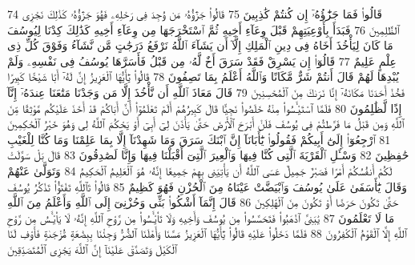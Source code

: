 {\tiny\colorbox{cl_aya}{74}} قَالُوا۟ فَمَا جَزَٰٓؤُهُۥٓ إِن كُنتُمْ كَٰذِبِينَ
{\tiny\colorbox{cl_aya}{75}} قَالُوا۟ جَزَٰٓؤُهُۥ مَن وُجِدَ فِى رَحْلِهِۦ فَهُوَ جَزَٰٓؤُهُۥ كَذَٰلِكَ نَجْزِى ٱلظَّٰلِمِينَ
{\tiny\colorbox{cl_aya}{76}} فَبَدَأَ بِأَوْعِيَتِهِمْ قَبْلَ وِعَآءِ أَخِيهِ ثُمَّ ٱسْتَخْرَجَهَا مِن وِعَآءِ أَخِيهِ كَذَٰلِكَ كِدْنَا لِيُوسُفَ مَا كَانَ لِيَأْخُذَ أَخَاهُ فِى دِينِ ٱلْمَلِكِ إِلَّآ أَن يَشَآءَ ٱللَّهُ نَرْفَعُ دَرَجَٰتٍ مَّن نَّشَآءُ وَفَوْقَ كُلِّ ذِى عِلْمٍ عَلِيمٌ
{\tiny\colorbox{cl_aya}{77}} قَالُوٓا۟ إِن يَسْرِقْ فَقَدْ سَرَقَ أَخٌ لَّهُۥ مِن قَبْلُ فَأَسَرَّهَا يُوسُفُ فِى نَفْسِهِۦ وَلَمْ يُبْدِهَا لَهُمْ قَالَ أَنتُمْ شَرٌّ مَّكَانًا وَٱللَّهُ أَعْلَمُ بِمَا تَصِفُونَ
{\tiny\colorbox{cl_aya}{78}} قَالُوا۟ يَٰٓأَيُّهَا ٱلْعَزِيزُ إِنَّ لَهُۥٓ أَبًا شَيْخًا كَبِيرًا فَخُذْ أَحَدَنَا مَكَانَهُۥٓ إِنَّا نَرَىٰكَ مِنَ ٱلْمُحْسِنِينَ
{\tiny\colorbox{cl_aya}{79}} قَالَ مَعَاذَ ٱللَّهِ أَن نَّأْخُذَ إِلَّا مَن وَجَدْنَا مَتَٰعَنَا عِندَهُۥٓ إِنَّآ إِذًا لَّظَٰلِمُونَ
{\tiny\colorbox{cl_aya}{80}} فَلَمَّا ٱسْتَيْـَٔسُوا۟ مِنْهُ خَلَصُوا۟ نَجِيًّا قَالَ كَبِيرُهُمْ أَلَمْ تَعْلَمُوٓا۟ أَنَّ أَبَاكُمْ قَدْ أَخَذَ عَلَيْكُم مَّوْثِقًا مِّنَ ٱللَّهِ وَمِن قَبْلُ مَا فَرَّطتُمْ فِى يُوسُفَ فَلَنْ أَبْرَحَ ٱلْأَرْضَ حَتَّىٰ يَأْذَنَ لِىٓ أَبِىٓ أَوْ يَحْكُمَ ٱللَّهُ لِى وَهُوَ خَيْرُ ٱلْحَٰكِمِينَ
{\tiny\colorbox{cl_aya}{81}} ٱرْجِعُوٓا۟ إِلَىٰٓ أَبِيكُمْ فَقُولُوا۟ يَٰٓأَبَانَآ إِنَّ ٱبْنَكَ سَرَقَ وَمَا شَهِدْنَآ إِلَّا بِمَا عَلِمْنَا وَمَا كُنَّا لِلْغَيْبِ حَٰفِظِينَ
{\tiny\colorbox{cl_aya}{82}} وَسْـَٔلِ ٱلْقَرْيَةَ ٱلَّتِى كُنَّا فِيهَا وَٱلْعِيرَ ٱلَّتِىٓ أَقْبَلْنَا فِيهَا وَإِنَّا لَصَٰدِقُونَ
{\tiny\colorbox{cl_aya}{83}} قَالَ بَلْ سَوَّلَتْ لَكُمْ أَنفُسُكُمْ أَمْرًا فَصَبْرٌ جَمِيلٌ عَسَى ٱللَّهُ أَن يَأْتِيَنِى بِهِمْ جَمِيعًا إِنَّهُۥ هُوَ ٱلْعَلِيمُ ٱلْحَكِيمُ
{\tiny\colorbox{cl_aya}{84}} وَتَوَلَّىٰ عَنْهُمْ وَقَالَ يَٰٓأَسَفَىٰ عَلَىٰ يُوسُفَ وَٱبْيَضَّتْ عَيْنَاهُ مِنَ ٱلْحُزْنِ فَهُوَ كَظِيمٌ
{\tiny\colorbox{cl_aya}{85}} قَالُوا۟ تَٱللَّهِ تَفْتَؤُا۟ تَذْكُرُ يُوسُفَ حَتَّىٰ تَكُونَ حَرَضًا أَوْ تَكُونَ مِنَ ٱلْهَٰلِكِينَ
{\tiny\colorbox{cl_aya}{86}} قَالَ إِنَّمَآ أَشْكُوا۟ بَثِّى وَحُزْنِىٓ إِلَى ٱللَّهِ وَأَعْلَمُ مِنَ ٱللَّهِ مَا لَا تَعْلَمُونَ
{\tiny\colorbox{cl_aya}{87}} يَٰبَنِىَّ ٱذْهَبُوا۟ فَتَحَسَّسُوا۟ مِن يُوسُفَ وَأَخِيهِ وَلَا تَا۟يْـَٔسُوا۟ مِن رَّوْحِ ٱللَّهِ إِنَّهُۥ لَا يَا۟يْـَٔسُ مِن رَّوْحِ ٱللَّهِ إِلَّا ٱلْقَوْمُ ٱلْكَٰفِرُونَ
{\tiny\colorbox{cl_aya}{88}} فَلَمَّا دَخَلُوا۟ عَلَيْهِ قَالُوا۟ يَٰٓأَيُّهَا ٱلْعَزِيزُ مَسَّنَا وَأَهْلَنَا ٱلضُّرُّ وَجِئْنَا بِبِضَٰعَةٍ مُّزْجَىٰةٍ فَأَوْفِ لَنَا ٱلْكَيْلَ وَتَصَدَّقْ عَلَيْنَآ إِنَّ ٱللَّهَ يَجْزِى ٱلْمُتَصَدِّقِينَ
